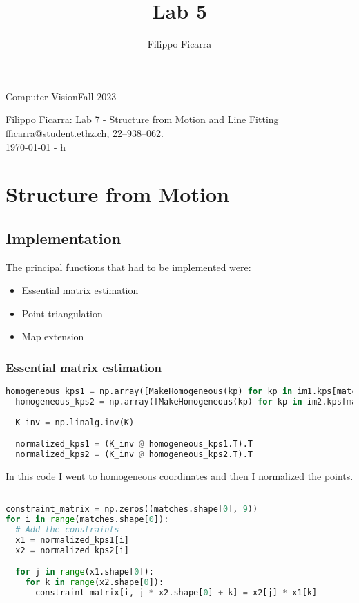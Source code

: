 \documentclass{ETHExercise}
\title{Lab 5}
\author{Filippo Ficarra}
\newcommand{\timestamp}{\ddmmyyyydate\today \,\,- \currenttime h}
\begin{document}
{}
{\Large Computer Vision}{Fall 2023}
\begin{center}
    {\Huge Filippo Ficarra: Lab 7 - Structure from Motion and Line Fitting}\\
      \quad\newline
      fficarra@student.ethz.ch, 22--938--062.\\
      \quad\newline
      \timestamp
      \end{center}



\section{Structure from Motion}
\subsection{Implementation}
The principal functions that had to be implemented were:
\begin{itemize}
  \item Essential matrix estimation
  \item Point triangulation
  \item Map extension
\end{itemize}

\subsubsection{Essential matrix estimation}

\begin{lstlisting}[language=Python, caption=homogeneous coordinate and normalizing]
  homogeneous_kps1 = np.array([MakeHomogeneous(kp) for kp in im1.kps[matches[:,0]]])
  homogeneous_kps2 = np.array([MakeHomogeneous(kp) for kp in im2.kps[matches[:,1]]])
  
  K_inv = np.linalg.inv(K)

  normalized_kps1 = (K_inv @ homogeneous_kps1.T).T
  normalized_kps2 = (K_inv @ homogeneous_kps2.T).T

\end{lstlisting}

In this code I went to homogeneous coordinates and then I normalized the points.

\begin{lstlisting}[language=Python, caption=homogeneous coordinate and normalizing]

constraint_matrix = np.zeros((matches.shape[0], 9))
for i in range(matches.shape[0]):
  # Add the constraints
  x1 = normalized_kps1[i]
  x2 = normalized_kps2[i]

  for j in range(x1.shape[0]):
    for k in range(x2.shape[0]):
      constraint_matrix[i, j * x2.shape[0] + k] = x2[j] * x1[k]
\end{lstlisting}
\end{document}
